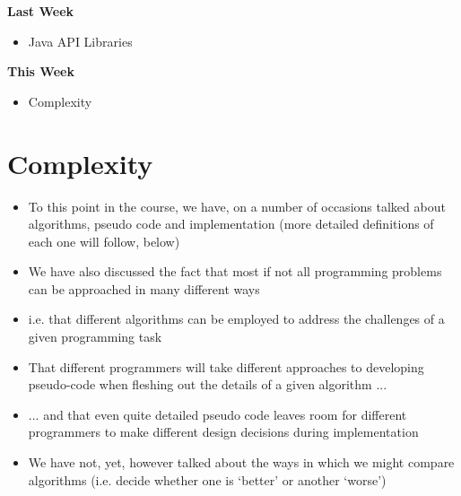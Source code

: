 \documentclass{beamer}
\begin{document}
\begin{frame}
\begin{center}
\textbf{Last Week}
\end{center}
\begin{itemize}
\item Java API Libraries
\end{itemize}
\end{frame}

\begin{frame}
\begin{center}
\textbf{This Week}
\end{center}
\begin{itemize}
\item Complexity
\end{itemize}
\end{frame}

\section{Complexity}
\begin{frame}
\begin{itemize}
\item To this point in the course, we have, on a number of occasions talked about algorithms, pseudo code and
implementation (more detailed definitions of each one will follow, below)
\item We have also discussed the fact that most if not all programming problems can be approached in many different ways
\item i.e. that different algorithms can be employed to address the challenges of a given programming task
\end{itemize}
\end{frame} 

\begin{frame}
\begin{itemize}
\item That different programmers will take different approaches to developing pseudo-code when fleshing out the details of a given algorithm ...
\item ... and that even quite detailed pseudo code leaves room for different programmers to make different design decisions
during implementation
\item We have not, yet, however talked about the ways in which we might compare algorithms (i.e. decide whether one is
`better' or another `worse')
\end{itemize}
\end{frame} 
\end{document}
